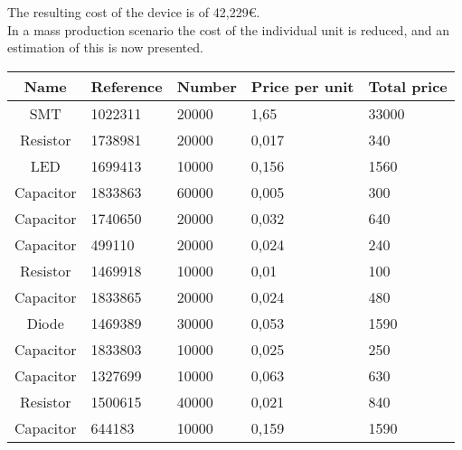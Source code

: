 	The resulting cost of the device is of 42,229{\small \euro}.\\

	In a mass production scenario the cost of the individual unit is reduced, and an estimation of this is now presented.\\

\begin{tabular}{| c |l | l | l | l |} 
	\hline
		Name & Reference & Number & Price per unit & Total price\\ \hline
		SMT & 1022311 & 20000 & 1,65 & 33000\\ \hline
		Resistor & 1738981 & 20000 & 0,017 & 340\\ \hline
		LED & 1699413 & 10000 & 0,156 & 1560\\ \hline
		Capacitor & 1833863 & 60000 & 0,005 & 300\\ \hline
		Capacitor & 1740650 & 20000 & 0,032 & 640\\ \hline
		Capacitor & 499110 & 20000 & 0,024 & 240\\ \hline
		Resistor & 1469918 & 10000 & 0,01 & 100\\ \hline
		Capacitor & 1833865 & 20000 & 0,024  & 480\\ \hline
		Diode & 1469389 & 30000 & 0,053 & 1590\\ \hline
	   	Capacitor & 1833803 & 10000 & 0,025 & 250\\ \hline
 		Capacitor & 1327699 & 10000 & 0,063 & 630 \\ \hline
  		Resistor & 1500615 & 40000 & 0,021 & 840\\ \hline
	 	Capacitor & 644183 & 10000 & 0,159 & 1590 \\ \hline
\end{tabular}\\\\
